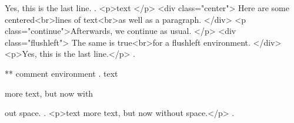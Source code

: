 Yes, this is the last line.
.
<p>text </p>
<div class="center"> Here are some centered<br>lines of text<br>as well as a paragraph. </div>
<p class="continue">Afterwards, we continue as usual. </p>
<div class="flushleft"> The same is true<br>for a ﬂushleft environment. </div>
<p>Yes, this is the last line.</p>
.



** comment environment
.
text
\begin{comment}
    This is a comment.
    \end{comment
    still more comment.
\end{comment}
more text, but now with%
\begin{comment}
    This is a comment.
\end{comment}
out space.
.
<p>text more text, but now without space.</p>
.